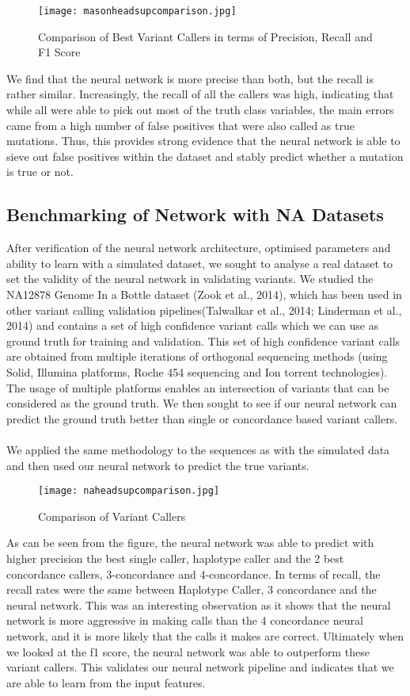 \documentclass{article}
\begin{document}
\begin{figure}[H]
\texttt{[image: masonheadsupcomparison.jpg]}
\caption{Comparison of Best Variant Callers in terms of Precision, Recall and F1 Score}
\centering
\end{figure}

We find that the neural network is more precise than both, but the recall is rather similar. Increasingly, the recall of all the callers was high, indicating that while all were able to pick out most of the truth class variables, the main errors came from a high number of false positives that were also called as true mutations. Thus, this provides strong evidence that the neural network is able to sieve out false positives within the dataset and stably predict whether a mutation is true or not.

\subsection{Benchmarking of Network with NA Datasets}
After verification of the neural network architecture, optimised parameters and ability to learn with a simulated dataset, we sought to analyse a real dataset to set the validity of the neural network in validating variants. We studied the NA12878 Genome In a Bottle dataset (Zook et al., 2014), which has been used in other variant calling validation pipelines(Talwalkar et al., 2014; Linderman et al., 2014) and contains a set of high confidence variant calls which we can use as ground truth for training and validation. This set of high confidence variant calls are obtained from multiple iterations of orthogonal sequencing methods (using Solid, Illumina platforms, Roche 454 sequencing and Ion torrent technologies). The usage of multiple platforms enables an intersection of variants that can be considered as the ground truth. We then sought to see if our neural network can predict the ground truth better than single or concordance based variant callers. \\\\We applied the same methodology to the sequences as with the simulated data and then used our neural network to predict the true variants.
\begin{figure}[H]
\texttt{[image: naheadsupcomparison.jpg]}
\caption{Comparison of Variant Callers}
\centering
\end{figure}
As can be seen from the figure, the neural network was able to predict with higher precision the best single caller, haplotype caller and the 2 best concordance callers, 3-concordance and 4-concordance. In terms of recall, the recall rates were the same between Haplotype Caller, 3 concordance and the neural network. This was an interesting observation as it shows that the neural network is more aggressive in making calls than the 4 concordance neural network, and it is more likely that the calls it makes are correct. Ultimately when we looked at the f1 score, the neural network was able to outperform these variant callers. This validates our neural network pipeline and indicates that we are able to learn from the input features. 
\newpage
\end{document}
